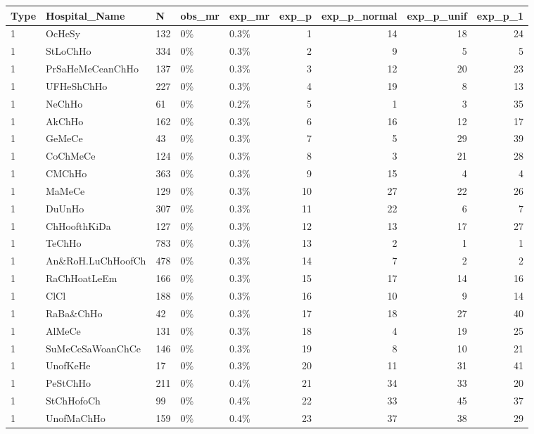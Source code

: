 \begin{longtable}{lllllrrrr}
  \hline
Type & Hospital\_Name & N & obs\_mr & exp\_mr & exp\_p & exp\_p\_normal & exp\_p\_unif & exp\_p\_1 \\ 
  \hline
1 & OcHeSy & 132 & 0\% & 0.3\% &   1 &  14 &  18 &  24 \\ 
  1 & StLoChHo & 334 & 0\% & 0.3\% &   2 &   9 &   5 &   5 \\ 
  1 & PrSaHeMeCeanChHo & 137 & 0\% & 0.3\% &   3 &  12 &  20 &  23 \\ 
  1 & UFHeShChHo & 227 & 0\% & 0.3\% &   4 &  19 &   8 &  13 \\ 
  1 & NeChHo & 61 & 0\% & 0.2\% &   5 &   1 &   3 &  35 \\ 
  1 & AkChHo & 162 & 0\% & 0.3\% &   6 &  16 &  12 &  17 \\ 
  1 & GeMeCe & 43 & 0\% & 0.3\% &   7 &   5 &  29 &  39 \\ 
  1 & CoChMeCe & 124 & 0\% & 0.3\% &   8 &   3 &  21 &  28 \\ 
  1 & CMChHo & 363 & 0\% & 0.3\% &   9 &  15 &   4 &   4 \\ 
  1 & MaMeCe & 129 & 0\% & 0.3\% &  10 &  27 &  22 &  26 \\ 
  1 & DuUnHo & 307 & 0\% & 0.3\% &  11 &  22 &   6 &   7 \\ 
  1 & ChHoofthKiDa & 127 & 0\% & 0.3\% &  12 &  13 &  17 &  27 \\ 
  1 & TeChHo & 783 & 0\% & 0.3\% &  13 &   2 &   1 &   1 \\ 
  1 & An\&RoH.LuChHoofCh & 478 & 0\% & 0.3\% &  14 &   7 &   2 &   2 \\ 
  1 & RaChHoatLeEm & 166 & 0\% & 0.3\% &  15 &  17 &  14 &  16 \\ 
  1 & ClCl & 188 & 0\% & 0.3\% &  16 &  10 &   9 &  14 \\ 
  1 & RaBa\&ChHo & 42 & 0\% & 0.3\% &  17 &  18 &  27 &  40 \\ 
  1 & AlMeCe & 131 & 0\% & 0.3\% &  18 &   4 &  19 &  25 \\ 
  1 & SuMeCeSaWoanChCe & 146 & 0\% & 0.3\% &  19 &   8 &  10 &  21 \\ 
  1 & UnofKeHe & 17 & 0\% & 0.3\% &  20 &  11 &  31 &  41 \\ 
  1 & PeStChHo & 211 & 0\% & 0.4\% &  21 &  34 &  33 &  20 \\ 
  1 & StChHofoCh & 99 & 0\% & 0.4\% &  22 &  33 &  45 &  37 \\ 
  1 & UnofMaChHo & 159 & 0\% & 0.4\% &  23 &  37 &  38 &  29 \\ 

\end{longtable}
